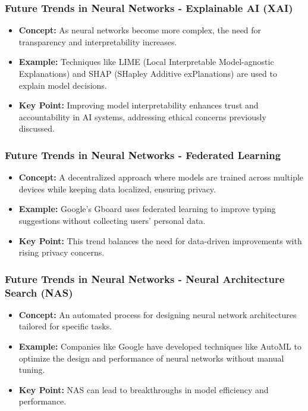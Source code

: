 \documentclass[aspectratio=169]{beamer}
\begin{document}
\begin{frame}[fragile]
    \frametitle{Future Trends in Neural Networks - Explainable AI (XAI)}
    \begin{itemize}
        \item \textbf{Concept:} As neural networks become more complex, the need for transparency and interpretability increases.
        \item \textbf{Example:} Techniques like LIME (Local Interpretable Model-agnostic Explanations) and SHAP (SHapley Additive exPlanations) are used to explain model decisions.
        \item \textbf{Key Point:} Improving model interpretability enhances trust and accountability in AI systems, addressing ethical concerns previously discussed.
    \end{itemize}
\end{frame}

\begin{frame}[fragile]
    \frametitle{Future Trends in Neural Networks - Federated Learning}
    \begin{itemize}
        \item \textbf{Concept:} A decentralized approach where models are trained across multiple devices while keeping data localized, ensuring privacy.
        \item \textbf{Example:} Google's Gboard uses federated learning to improve typing suggestions without collecting users' personal data.
        \item \textbf{Key Point:} This trend balances the need for data-driven improvements with rising privacy concerns.
    \end{itemize}
\end{frame}

\begin{frame}[fragile]
    \frametitle{Future Trends in Neural Networks - Neural Architecture Search (NAS)}
    \begin{itemize}
        \item \textbf{Concept:} An automated process for designing neural network architectures tailored for specific tasks.
        \item \textbf{Example:} Companies like Google have developed techniques like AutoML to optimize the design and performance of neural networks without manual tuning.
        \item \textbf{Key Point:} NAS can lead to breakthroughs in model efficiency and performance.
    \end{itemize}
\end{frame}
\end{document}
